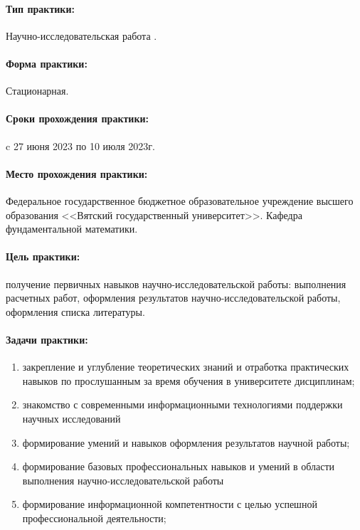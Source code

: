 \documentclass[14pt,Report]{diplomwork}
\date{2020}
\author[Заботин М.\,А.]{МКб-3301-51-00}{Заботин Михаил Алексеевич}
\institute{математики и информационных систем}
\begin{document}
	\maketitle
	\makereferat
	\tableofcontents
		\paragraph{Тип практики:}
		Научно-исследовательская работа .
		\paragraph{Форма практики:} Стационарная.
		\paragraph{Сроки прохождения практики:}
			c 27 июня 2023 по 10 июля 2023г.
		\paragraph{Место прохождения практики:}
			Федеральное государственное бюджетное
			образовательное учреждение высшего образования
			<<Вятский государственный университет>>.
			Кафедра фундаментальной математики.
			\paragraph{Цель практики:}
				получение первичных навыков
				научно-исследовательской работы:
				выполнения расчетных работ,
				оформления результатов научно-исследовательской работы,
				оформления списка литературы.

			\paragraph{Задачи практики:}
			\begin{enumerate}
				\item
					закрепление и углубление теоретических знаний
					и отработка практических навыков по прослушанным
					за время обучения в университете дисциплинам; 
				\item
					знакомство с современными информационными
					технологиями поддержки  научных исследований
				\item
					формирование умений и навыков оформления
					результатов научной работы;
				\item
					формирование  базовых профессиональных навыков и
					умений в области выполнения научно-исследовательской работы
				\item
					формирование информационной компетентности с
					целью успешной профессиональной деятельности;
			\end{enumerate}
\end{document}
